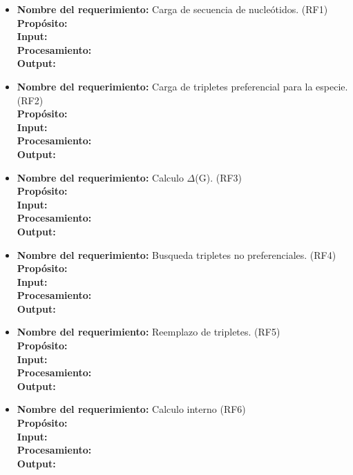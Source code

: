 \documentclass[12pt,a4paper,english,spanish]{article}
\begin{document}
	\begin{itemize}
		\item \textbf{Nombre del requerimiento:} Carga de secuencia de nucleótidos. (RF1)\\
			  \textbf{Propósito:} \\
			  \textbf{Input:} \\
			  \textbf{Procesamiento:} \\
			  \textbf{Output:} \\

		\item \textbf{Nombre del requerimiento:} Carga de tripletes preferencial para la especie. (RF2)\\
			  \textbf{Propósito:} \\
			  \textbf{Input:} \\
			  \textbf{Procesamiento:} \\
			  \textbf{Output:} \\

		\item \textbf{Nombre del requerimiento:} Calculo $\Delta$(G). (RF3)\\
			  \textbf{Propósito:} \\
			  \textbf{Input:} \\
			  \textbf{Procesamiento:} \\
			  \textbf{Output:} \\

		\item \textbf{Nombre del requerimiento:} Busqueda  tripletes no preferenciales. (RF4)\\
			  \textbf{Propósito:} \\
			  \textbf{Input:} \\
			  \textbf{Procesamiento:} \\
			  \textbf{Output:} \\

		\item \textbf{Nombre del requerimiento:} Reemplazo de tripletes. (RF5)\\
			  \textbf{Propósito:} \\
			  \textbf{Input:} \\
			  \textbf{Procesamiento:} \\
			  \textbf{Output:} \\

		\item \textbf{Nombre del requerimiento:} Calculo interno (RF6)\\
			  \textbf{Propósito:} \\
			  \textbf{Input:} \\
			  \textbf{Procesamiento:} \\
			  \textbf{Output:} \\


\end{itemize}
\end{document}
